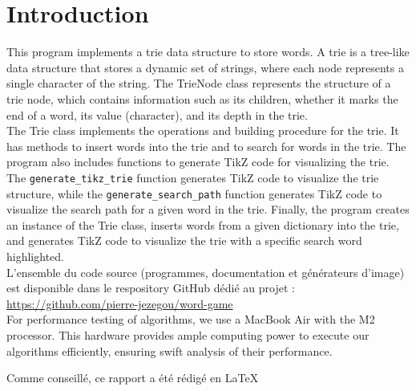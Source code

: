 \documentclass[10pt,a4paper,hidelinks]{article}
\begin{document}

\tableofcontents

\section{Introduction}
This program implements a trie data structure to store words.
A trie is a tree-like data structure that stores a dynamic set of strings, where each node represents a single character of the string.
The TrieNode class represents the structure of a trie node, which contains information such as its children, whether it marks the end of a word, its value (character), and its depth in the trie.\\

The Trie class implements the operations and building procedure for the trie. It has methods to insert words into the trie and to search for words in the trie.
The program also includes functions to generate TikZ code for visualizing the trie. The \verb|generate_tikz_trie| function generates TikZ code to visualize the trie structure, while the \verb|generate_search_path| function generates TikZ code to visualize the search path for a given word in the trie.
Finally, the program creates an instance of the Trie class, inserts words from a given dictionary into the trie, and generates TikZ code to visualize the trie with a specific search word highlighted.\\

L'ensemble du code source (programmes, documentation et générateurs d'image) est disponible dans le respository GitHub dédié au projet : \url{https://github.com/pierre-jezegou/word-game}\\

For performance testing of algorithms, we use a MacBook Air with the M2 processor. This hardware provides ample computing power to execute our algorithms efficiently, ensuring swift analysis of their performance.

Comme conseillé, ce rapport a été rédigé en \LaTeX
\end{document}
